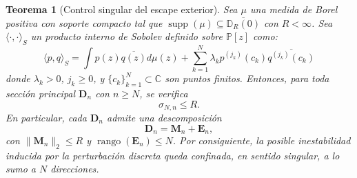 \documentclass[12pt,a4paper]{article}
\newtheorem{theorem}{Teorema}
\theoremstyle{definition}
\theoremstyle{remark}
\begin{document}
\begin{theorem}[Control singular del escape exterior]\label{thm:control_singular_escape}
	Sea $\mu$ una medida de Borel positiva con soporte compacto tal que $\operatorname{supp}(\mu) \subseteq \overline{\mathbb{D}_R(0)}$ con $R < \infty$. Sea $\langle \cdot, \cdot \rangle_S$ un producto interno de Sobolev definido sobre $\mathbb{P}[z]$ como:
	\begin{equation}\label{eq:sobolev_general_singular}
		\langle p, q \rangle_S = \int p(z)\overline{q(z)} d\mu(z) + \sum_{k=1}^N \lambda_k p^{(j_k)}(c_k) \overline{q^{(j_k)}(c_k)}
	\end{equation}
	donde $\lambda_k > 0$, $j_k \ge 0$, y $\{c_k\}_{k=1}^N \subset \mathbb{C}$ son puntos finitos. Entonces, para toda sección principal $\mathbf{D}_n$ con $n \ge N$, se verifica
	\[
		\sigma_{N,n} \le R.
	\]
	En particular, cada $\mathbf{D}_n$ admite una descomposición
	\[
		\mathbf{D}_n = \mathbf{M}_n + \mathbf{E}_n,
	\]
	con $\|\mathbf{M}_n\|_2 \le R$ y $\operatorname{rango}(\mathbf{E}_n) \le N$. Por consiguiente, la posible inestabilidad inducida por la perturbación discreta queda confinada, en sentido singular, a lo sumo a $N$ direcciones.
\end{theorem}
\end{document}
